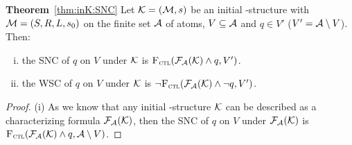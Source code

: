 \documentclass{article}
\begin{document}
\textbf{Theorem}~\ref{thm:inK:SNC} Let ${\cal K}= ({\cal M}, s)$ be an initial \MPK-structure with ${\cal M}=(S,R,L,s_0)$ on the finite set ${\cal A}$ of atoms, $V \subseteq {\cal A}$ and $q\in V'$ ($V' = {\cal A} \setminus V$). Then:
 \begin{enumerate}[(i)]
   \item the SNC of $q$ on $V$ under ${\cal K}$ is ${\textsc{F}_{\textsc{ctl}}}({\cal F}_{{\cal A}}({\cal K}) \wedge q, V')$.
   \item the WSC of $q$ on $V$ under ${\cal K}$ is $\neg {\textsc{F}_{\textsc{ctl}}}({\cal F}_{{\cal A}}({\cal K}) \wedge \neg q, V')$.
 \end{enumerate}
\begin{proof}
(i)
As we know that any initial \MPK-structure ${\cal K}$ can be described as a characterizing formula ${\cal F}_{{\cal A}}({\cal K})$, then the SNC of $q$ on $V$ under ${\cal F}_{{\cal A}}({\cal K})$ is ${\textsc{F}_{\textsc{ctl}}}({\cal F}_{{\cal A}}({\cal K}) \wedge q, {\cal A} \setminus V)$.

%


\end{proof}
\end{document}
